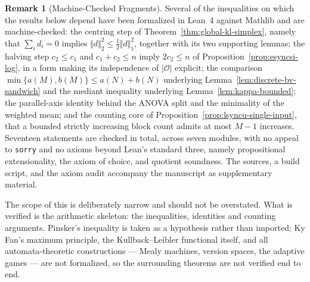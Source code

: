 \documentclass[12pt]{article}
\theoremstyle{definition}
\newtheorem{remark}[theorem]{Remark}
\begin{document}
\begin{remark}[Machine-Checked Fragments]
\label{rem:lean-formalization}
Several of the inequalities on which the results below depend have been
formalized in Lean~4 against Mathlib and are machine-checked: the centring step of
Theorem~\ref{thm:global-kl-simplex}, namely that $\sum_id_i=0$ implies
$\Vert d\Vert_2^2\le\tfrac12\Vert d\Vert_1^2$, together with its two
supporting lemmas; the halving step
$c_2\le c_1$ and $c_1+c_2\le n$ imply $2c_2\le n$ of
Proposition~\ref{prop:esyncsi-log}, in a form making its independence of
$|\mathcal O|$ explicit; the comparison
$\min\{a(M),b(M)\}\le a(N)+b(N)$ underlying
Lemma~\ref{lem:discrete-bv-sandwich} and the mediant inequality underlying
Lemma~\ref{lem:kappa-bounded}; the parallel-axis identity behind the ANOVA
split and the minimality of the weighted mean; and the counting core of
Proposition~\ref{prop:lsyncu-single-input}, that a bounded strictly increasing
block count admits at most $M-1$ increases.  Seventeen statements are checked
in total, across seven modules, with no appeal to \texttt{sorry} and no axioms
beyond Lean's standard three, namely propositional extensionality, the axiom
of choice, and quotient soundness.  The sources, a build script, and the axiom
audit accompany the manuscript as supplementary material.

The scope of this is deliberately narrow and should not be overstated.  What is
verified is the arithmetic skeleton: the inequalities, identities and counting
arguments.  Pinsker's inequality is taken as a hypothesis rather than imported;
Ky Fan's maximum principle, the Kullback--Leibler functional itself, and all
automata-theoretic constructions --- Mealy machines, version spaces, the
adaptive games --- are not formalized, so the surrounding theorems are not
verified end to end.

\end{remark}
\end{document}

